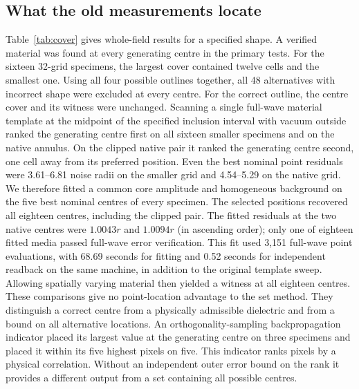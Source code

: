 \subsection{What the old measurements locate}
Table~\ref{tab:cover} gives whole-field results for a specified shape. A verified material was found at every generating centre in the primary tests. For the sixteen 32-grid specimens, the largest cover contained twelve cells and the smallest one. Using all four possible outlines together, all 48 alternatives with incorrect shape were excluded at every centre. For the correct outline, the centre cover and its witness were unchanged. Scanning a single full-wave material template at the midpoint of the specified inclusion interval with vacuum outside ranked the generating centre first on all sixteen smaller specimens and on the native annulus. On the clipped native pair it ranked the generating centre second, one cell away from its preferred position. Even the best nominal point residuals were 3.61--6.81 noise radii on the smaller grid and 4.54--5.29 on the native grid. We therefore fitted a common core amplitude and homogeneous background on the five best nominal centres of every specimen. The selected positions recovered all eighteen centres, including the clipped pair. The fitted residuals at the two native centres were $1.0043r$ and $1.0094r$ (in ascending order); only one of eighteen fitted media passed full-wave error verification. This fit used 3,151 full-wave point evaluations, with 68.69 seconds for fitting and 0.52 seconds for independent readback on the same machine, in addition to the original template sweep. Allowing spatially varying material then yielded a witness at all eighteen centres. These comparisons give no point-location advantage to the set method. They distinguish a correct centre from a physically admissible dielectric and from a bound on all alternative locations. An orthogonality-sampling backpropagation indicator placed its largest value at the generating centre on three specimens and placed it within its five highest pixels on five. This indicator ranks pixels by a physical correlation. Without an independent outer error bound on the rank it provides a different output from a set containing all possible centres.


